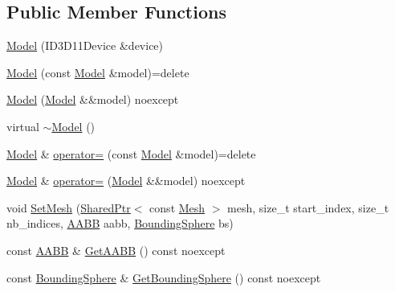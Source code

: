 \subsection*{Public Member Functions}
\begin{DoxyCompactItemize}
\item 
\mbox{\hyperlink{classmage_1_1rendering_1_1_model_a7f135a6ed7604655e94d3264bd9d5c62}{Model}} (I\+D3\+D11\+Device \&device)
\item 
\mbox{\hyperlink{classmage_1_1rendering_1_1_model_a59a64dc710efaa44b9f256883d0ab9cb}{Model}} (const \mbox{\hyperlink{classmage_1_1rendering_1_1_model}{Model}} \&model)=delete
\item 
\mbox{\hyperlink{classmage_1_1rendering_1_1_model_a550ece2d159145d9e9549e48235d1ca1}{Model}} (\mbox{\hyperlink{classmage_1_1rendering_1_1_model}{Model}} \&\&model) noexcept
\item 
virtual \mbox{\hyperlink{classmage_1_1rendering_1_1_model_a8fd12c516788a98ce5109aee41d834b8}{$\sim$\+Model}} ()
\item 
\mbox{\hyperlink{classmage_1_1rendering_1_1_model}{Model}} \& \mbox{\hyperlink{classmage_1_1rendering_1_1_model_aa7edda6386fa2ae0638e5c46dccff016}{operator=}} (const \mbox{\hyperlink{classmage_1_1rendering_1_1_model}{Model}} \&model)=delete
\item 
\mbox{\hyperlink{classmage_1_1rendering_1_1_model}{Model}} \& \mbox{\hyperlink{classmage_1_1rendering_1_1_model_a2b374cb908e39da8ff35ea5c17ce640d}{operator=}} (\mbox{\hyperlink{classmage_1_1rendering_1_1_model}{Model}} \&\&model) noexcept
\item 
void \mbox{\hyperlink{classmage_1_1rendering_1_1_model_abb5ea57049494e271bcd5b05842d4f8e}{Set\+Mesh}} (\mbox{\hyperlink{namespacemage_a1e01ae66713838a7a67d30e44c67703e}{Shared\+Ptr}}$<$ const \mbox{\hyperlink{classmage_1_1rendering_1_1_mesh}{Mesh}} $>$ mesh, size\+\_\+t start\+\_\+index, size\+\_\+t nb\+\_\+indices, \mbox{\hyperlink{classmage_1_1_a_a_b_b}{A\+A\+BB}} aabb, \mbox{\hyperlink{classmage_1_1_bounding_sphere}{Bounding\+Sphere}} bs)
\item 
const \mbox{\hyperlink{classmage_1_1_a_a_b_b}{A\+A\+BB}} \& \mbox{\hyperlink{classmage_1_1rendering_1_1_model_a05a767ef1551aa4c09c223d8f2311855}{Get\+A\+A\+BB}} () const noexcept
\item 
const \mbox{\hyperlink{classmage_1_1_bounding_sphere}{Bounding\+Sphere}} \& \mbox{\hyperlink{classmage_1_1rendering_1_1_model_a8885748932b52ec2d5bde368db6a130d}{Get\+Bounding\+Sphere}} () const noexcept
\item 

\end{DoxyCompactItemize}
